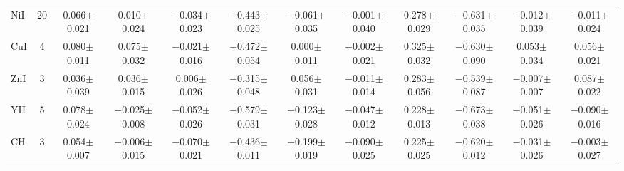 \documentclass[oneside]{emulateapj}
\begin{document}
\begin{table}
\begin{tabular}{lccccccccccc}
NiI & 20 & 0.066$\pm$0.021 & 0.010$\pm$0.024 & $-$0.034$\pm$0.023 & $-$0.443$\pm$0.025 & $-$0.061$\pm$0.035 & $-$0.001$\pm$0.040 & 0.278$\pm$0.029 & $-$0.631$\pm$0.035 & $-$0.012$\pm$0.039 & $-$0.011$\pm$0.024 \\
CuI & 4 & 0.080$\pm$0.011 & 0.075$\pm$0.032 & $-$0.021$\pm$0.016 & $-$0.472$\pm$0.054 & 0.000$\pm$0.011 & $-$0.002$\pm$0.021 & 0.325$\pm$0.032 & $-$0.630$\pm$0.090 & 0.053$\pm$0.034 & 0.056$\pm$0.021 \\
ZnI & 3 & 0.036$\pm$0.039 & 0.036$\pm$0.015 & 0.006$\pm$0.026 & $-$0.315$\pm$0.048 & 0.056$\pm$0.031 & $-$0.011$\pm$0.014 & 0.283$\pm$0.056 & $-$0.539$\pm$0.087 & $-$0.007$\pm$0.007 & 0.087$\pm$0.022 \\
YII & 5 & 0.078$\pm$0.024 & $-$0.025$\pm$0.008 & $-$0.052$\pm$0.026 & $-$0.579$\pm$0.031 & $-$0.123$\pm$0.028 & $-$0.047$\pm$0.012 & 0.228$\pm$0.013 & $-$0.673$\pm$0.038 & $-$0.051$\pm$0.026 & $-$0.090$\pm$0.016 \\
CH & 3 & 0.054$\pm$0.007 & $-$0.006$\pm$0.015 & $-$0.070$\pm$0.021 & $-$0.436$\pm$0.011 & $-$0.199$\pm$0.019 & $-$0.090$\pm$0.025 & 0.225$\pm$0.025 & $-$0.620$\pm$0.012 & $-$0.031$\pm$0.026 & $-$0.003$\pm$0.027 \\
\hline       
\end{tabular}
\end{table}
\end{document}
